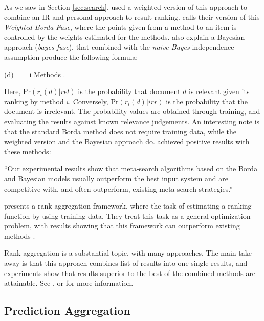 As we saw in Section \ref{sec:search}, \citet[p3]{Xu2008} used a weighted version
of this approach to combine an IR and personal approach to result ranking.
\citet[p3]{Aslam2001} calls their version of this \emph{Weighted Borda-Fuse},
where the points given from a method to an item is controlled
by the weights estimated for the methods.
\citet[p4]{Aslam2001} also explain a Bayesian approach (\emph{bayes-fuse}),
that combined with the \emph{naive Bayes} independence assumption 
produce the following formula:

\begin{eqsp}
  (d)  = \sum_{i \in Methods} \log 
    .
\end{eqsp}

Here, $\mathrm{Pr}(r_i(d) | rel)$ is the probability that document $d$
is relevant given its ranking by method $i$.
Conversely, $\mathrm{Pr}(r_i(d) | irr)$ is the probability that the document 
is irrelevant. The probability values are obtained through training,
and evaluating the results against known relevance judgements.
An interesting note is that the standard Borda method does not require training data,
while the weighted version and the Bayesian approach do.
\citet{Aslam2001} achieved positive results with these methods:

\begin{blockquote}
``Our experimental results show that meta-search algorithms based on the 
Borda and Bayesian models usually outperform the best input system 
and are competitive with, and often outperform, 
existing meta-search strategies.''
\end{blockquote}

\cite{Liu2007} presents a rank-aggregation framework, where
the task of estimating a ranking function by using training data.
They treat this task as a general optimization problem, with results
showing that this framework can outperform existing methods \cite[p7]{Liu2007}.

Rank aggregation is a substantial topic, with many approaches.
The main take-away is that this approach combines list of results
into one single results, and experiments show that results superior
to the best of the combined methods are attainable.
See \cite{Aslam2001}, \cite{Liu2007} or \cite{Klementiev2008} 
for more information.


\subsection{Prediction Aggregation}
\label{sec:theory:predictionagg}

